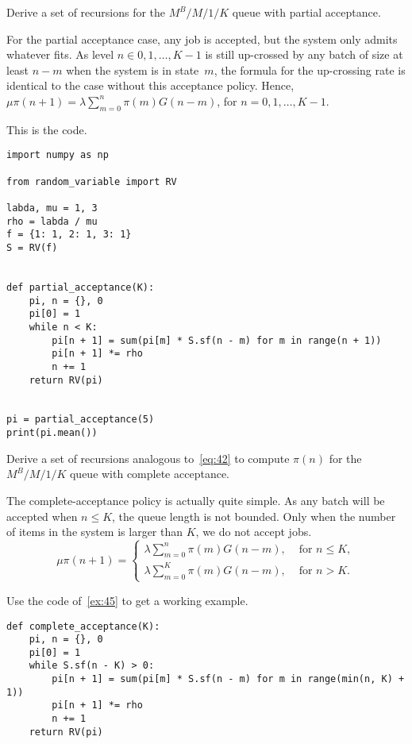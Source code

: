 \documentclass[stochastic-or.tex]{subfiles}
\begin{document}
\begin{exercise}\label{ex:45}
 Derive a set of recursions for the $M^B/M/1/K$ queue with partial acceptance.
\begin{solution}
  For the partial acceptance case, any job is accepted, but the system only admits whatever fits.
  As level $n\in {0,1,\ldots,K-1}$ is still up-crossed by any batch of size at least $n-m$ when the system is in state~$m$, the formula for the up-crossing rate is identical to the case without this acceptance policy.
  Hence, $\mu \pi(n+1) = \lambda \sum_{m=0}^n \pi(m) G(n-m)$, for $n=0,1,\ldots, K-1$.

This is the code.
\begin{verbatim}
import numpy as np

from random_variable import RV

labda, mu = 1, 3
rho = labda / mu
f = {1: 1, 2: 1, 3: 1}
S = RV(f)


def partial_acceptance(K):
    pi, n = {}, 0
    pi[0] = 1
    while n < K:
        pi[n + 1] = sum(pi[m] * S.sf(n - m) for m in range(n + 1))
        pi[n + 1] *= rho
        n += 1
    return RV(pi)


pi = partial_acceptance(5)
print(pi.mean())
\end{verbatim}

\end{solution}
\end{exercise}



\begin{exercise}\label{ex:9}
 Derive a set of recursions analogous to~\cref{eq:42} to compute $\pi(n)$ for the $M^B/M/1/K$ queue with complete acceptance.
\begin{solution}
 The complete-acceptance policy is actually quite simple. As any
 batch will be accepted when $n\leq K$, the queue length is not
 bounded. Only when the number of items in the system is larger than
 $K$, we do not accept jobs.
 \begin{equation*}
 \mu \pi(n+1) =
 \begin{cases}
 \lambda \sum_{m=0}^n \pi(m) G(n-m), & \text{ for } n\leq K,\\
 \lambda \sum_{m=0}^K \pi(m) G(n-m), & \text{ for } n> K.
 \end{cases}
 \end{equation*}

Use the code of~\cref{ex:45} to get a working example.
\begin{verbatim}
def complete_acceptance(K):
    pi, n = {}, 0
    pi[0] = 1
    while S.sf(n - K) > 0:
        pi[n + 1] = sum(pi[m] * S.sf(n - m) for m in range(min(n, K) + 1))
        pi[n + 1] *= rho
        n += 1
    return RV(pi)
\end{verbatim}

\end{solution}
\end{exercise}
\end{document}
